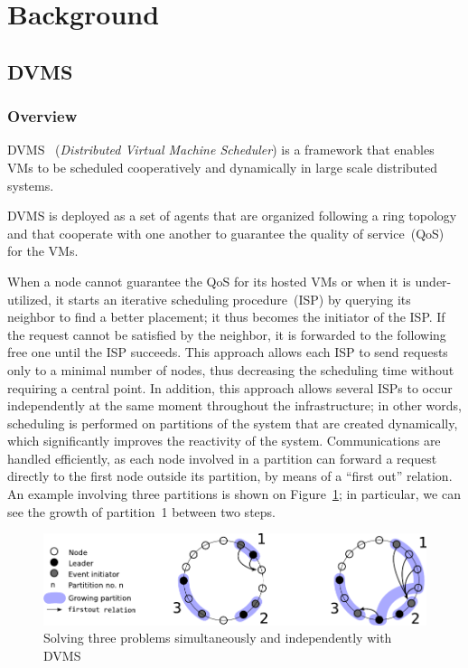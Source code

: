 \section{Background}


\subsection{DVMS}

\subsubsection{Overview}
DVMS~\cite{quesnel:cpe12}
(\emph{Distributed Virtual Machine Scheduler}) is a framework that enables VMs
to be scheduled cooperatively and dynamically in large scale distributed
systems.

DVMS is deployed as a set of agents that are organized following a ring
topology and that cooperate with one another to guarantee the quality of
service~(QoS) for the VMs.

When a node cannot guarantee the QoS for its hosted VMs or when it is
under-utilized, it starts an iterative scheduling procedure~(ISP) by querying
its neighbor to find a better placement; it thus becomes the initiator of the ISP.
If the request cannot be satisfied by the neighbor, it is forwarded to the
following free one until the ISP succeeds.
This approach allows each ISP to send requests only to a minimal
number of nodes, thus decreasing the scheduling time without requiring a
central point.
In addition, this approach allows several ISPs to occur independently at the
same moment throughout the infrastructure; in other words, scheduling is
performed on partitions of the system that are created dynamically, which
significantly improves the reactivity of the system.
Communications are handled efficiently, as each node involved in a partition
can forward a request directly to the first node outside its partition, by
means of a ``first out'' relation.
An example involving three partitions is shown on Figure~\ref{fig:isp}; in
particular, we can see the growth of partition~1 between two steps.
\begin{figure}[h!]
  \centering
  \includegraphics[width=0.9\linewidth]{Figures/resourceAcquisition-standard.pdf}
  \caption{Solving three problems simultaneously and independently with DVMS}%
  \label{fig:isp}%
\end{figure}

